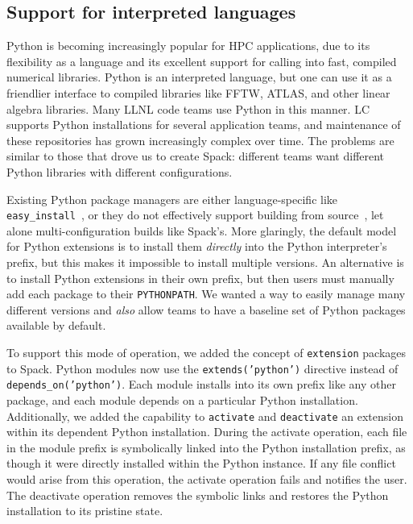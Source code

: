 
\subsection{Support for interpreted languages}
\label{sec:usecase-python}

Python is becoming increasingly popular for HPC applications, 
due to its flexibility as a language and its excellent support
for calling into fast, compiled numerical libraries.
Python is an interpreted language, but one can use it
as a friendlier interface to compiled libraries like FFTW, ATLAS, and
other linear algebra libraries.  Many LLNL code teams use Python in this manner.
%
LC supports Python installations for several application teams,
and maintenance of these repositories has grown increasingly complex over
time.  The problems are similar to those that drove us to create
Spack: different teams want different Python libraries with different
configurations.

Existing Python package managers are either language-specific like 
{\tt easy\_install}~\cite{eby:setuptools}, 
or they do not effectively support building from source~\cite{anaconda,conda}, let
alone multi-configuration builds like Spack's.  More glaringly, the default
model for Python extensions is to install them {\it directly} into the Python
interpreter's prefix, but this makes it impossible to install multiple versions.
An alternative is to install Python extensions in their own prefix,
but then users must manually add each package to their {\tt PYTHONPATH}. 
We wanted a way to  easily manage many different versions and {\it also} allow teams
to have a baseline set of Python packages available by default.

To support this mode of operation, we added the concept of {\tt extension} packages
to Spack. Python modules now use the {\tt extends('python')} directive instead of
{\tt depends\_on('python')}.
Each module installs into its own prefix like any other package,
and each module depends on a particular Python installation.
Additionally, we added the capability to {\tt activate} and {\tt deactivate} an
extension within its dependent Python installation.  During the activate operation, each file
in the module prefix is symbolically linked into the Python installation prefix, as though it were
directly installed within the Python instance. If any file conflict would arise from this operation,
the activate operation fails and notifies the user.
The deactivate operation removes the symbolic links and restores the Python installation to its 
pristine state. 

